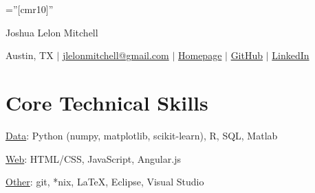 \documentclass[a4paper,10pt]{article}
\begin{document}

\pagestyle{empty} %

\font\fb=''[cmr10]'' %

\par{\centering
		{\Huge Joshua Lelon Mitchell
	}\par}
\par{\centering
		{
	Austin, TX
	$\mid$
	\href {mailto:jlelonmitchell@gmail.com}{jlelonmitchell@gmail.com}
	$\mid$
	\href {http://lelon.io/}{Homepage}
	$\mid$
	\href {https://github.com/joshualmitchell}{GitHub}
	$\mid$
	\href {https://www.linkedin.com/in/joshua-mitchell-17b94077/}{LinkedIn}
}\par}

\section{Core Technical Skills}

\underline{Data}: Python (numpy, matplotlib, scikit-learn), R, SQL, Matlab

\underline{Web}: HTML/CSS, JavaScript, Angular.js

\underline{Other}: git, *nix, LaTeX, Eclipse, Visual Studio

\end{document}
